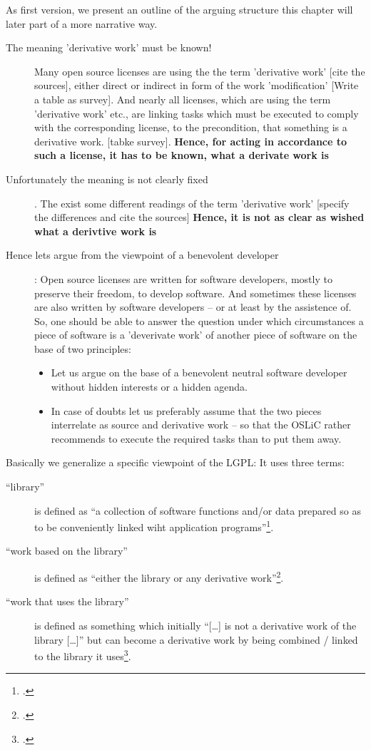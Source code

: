 As first version, we present an outline of the arguing structure this chapter
will later part of a more narrative way.

\begin{description}
  \item[The meaning 'derivative work' must be known!] Many open source licenses
  are using the the term 'derivative work'  [cite the sources], either direct or
  indirect in form of the work 'modification' [Write a table as survey]. And
  nearly all licenses, which are using the term 'derivative work' etc., are
  linking tasks which must be executed to comply with the corresponding license,
  to the precondition, that something is a derivative work.
  [tabke survey]. \textbf{Hence, for acting in accordance to such a license, it
  has to be known, what a derivate work is}
  \item[Unfortunately the meaning is not clearly fixed]. The exist some
  different readings of the term 'derivative work' [specify the differences and
  cite the sources] \textbf{Hence, it is not as clear as wished what a derivtive
  work is}
  \item[Hence lets argue from the viewpoint of a benevolent developer]: Open
  source licenses are written for software developers, mostly to preserve their
  freedom, to develop software. And sometimes these licenses are also written by
  software developers -- or at least by the assistence of. So, one should be
  able to answer the question under which circumstances a piece of software is a
  'deverivate work' of another piece of software on the base of two principles:
  \begin{itemize}
  \item Let us argue on the base of a benevolent neutral software developer
  without hidden interests or a hidden agenda.
  \item In case of doubts let us preferably assume that the two pieces
  interrelate as source and derivative work -- so that the OSLiC rather recommends
  to execute the required tasks than to put them away.
\end{itemize}
\end{description}

Basically we generalize a specific viewpoint of the LGPL: It uses three terms:

\begin{description}
  \item[\enquote{library}] is defined as \enquote{a collection of software
  functions and/or data prepared so as to be conveniently linked wiht
  application programs}\footcite[cf.][\nopage wp §0]{Lgpl21OsiLicense1999a}.
  \item[\enquote{work based on the library}] is defined as \enquote{either the
  library or any derivative work}\footcite[cf.][\nopage wp
  §0]{Lgpl21OsiLicense1999a}.
  \item[\enquote{work that uses the library}] is defined as something which
  initially \enquote{[\ldots] is not a derivative work of the library [\ldots]}
  but can become a derivative work by being combined / linked to the library it
  uses\footcite[cf.][\nopage wp §5]{Lgpl21OsiLicense1999a}.
\end{description}

